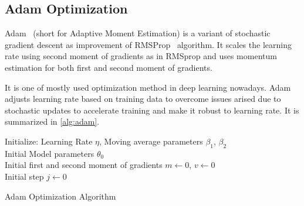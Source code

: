 \subsection{Adam Optimization}

Adam~\cite{kingma_adam_2017}  (short for Adaptive Moment Estimation) is a variant of stochastic gradient descent as improvement of RMSProp~ \cite{hinton_lecture_nodate} algorithm. 
It scales the learning rate using second moment of gradients as in RMSprop and uses momentum estimation for both first and second moment of gradients. 

It is one of mostly used optimization method in deep learning nowadays. 
Adam adjusts learning rate based on training data to overcome issues arised due to stochastic updates to accelerate training and make it robust to learning rate. 
It is summarized in \ref{alg:adam}. 

\begin{algorithm}[H]
	\SetAlgoLined
	\DontPrintSemicolon %
	Initialize: Learning Rate $\eta$, Moving average parameters $\beta_1$, $\beta_2$\\
	Initial Model parameters $\theta_0$ \\
	Initial first and second moment of gradients $m \leftarrow 0$, $v \leftarrow 0$ \\
	Initial step $j \leftarrow 0$ \\
	\caption{Adam Optimization Algorithm}
	\label{alg:adam}
\end{algorithm}
